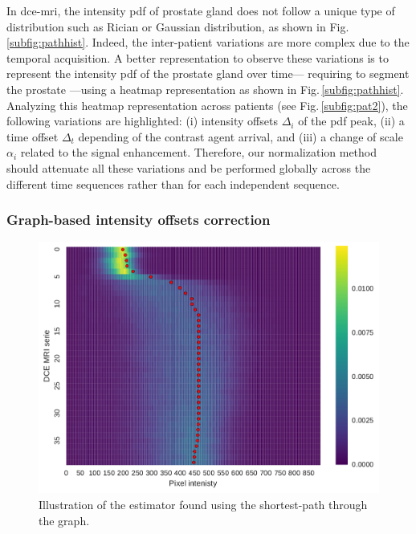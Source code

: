 In \ac{dce}-\ac{mri}, the intensity \ac{pdf} of prostate gland does not follow a unique type of distribution such as Rician or Gaussian distribution, as shown in Fig.\,\ref{subfig:pathhist}.
Indeed, the inter-patient variations are more complex due to the temporal acquisition.
A better representation to observe these variations is to represent the intensity \ac{pdf} of the prostate gland over time--- requiring to segment the prostate ---using a heatmap representation as shown in Fig.\,\ref{subfig:pathhist}.
Analyzing this heatmap representation across patients (see Fig.\,\ref{subfig:pat2}), the following variations are highlighted:
(i) intensity offsets $\Delta_i$ of the \ac{pdf} peak,
(ii) a time offset $\Delta_t$ depending of the contrast agent arrival, and
(iii) a change of scale $\alpha_i$ related to the signal enhancement.
Therefore, our normalization method should attenuate all these variations and be performed globally across the different time sequences rather than for each independent sequence.

\subsubsection{Graph-based intensity offsets correction}\label{sec:intoffsets}

\begin{figure}
  \centering
  \includegraphics[width=0.7\linewidth]{02_methods/figures/estimator.pdf}
  \caption{Illustration of the estimator found using the shortest-path through the graph.}
  \label{fig:estimator}
\end{figure}

